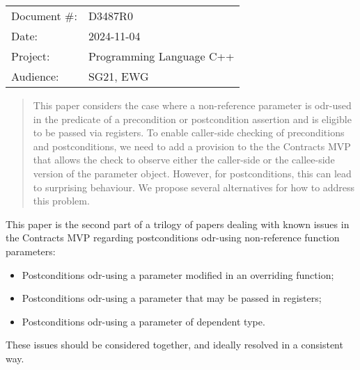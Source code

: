 \begin{tabular}{ll}
Document \#: & D3487R0 \\
Date: &2024-11-04 \\
Project: & Programming Language C++ \\
Audience: & SG21, EWG
\end{tabular}

\begin{abstract}
This paper considers the case where a non-reference parameter is odr-used in the predicate of a precondition or postcondition assertion and is eligible to be passed via registers. To enable caller-side checking of preconditions and postconditions, we need to add a provision to the the Contracts MVP \cite{P2900R10} that allows the check to observe either the caller-side or the callee-side version of the parameter object. However, for postconditions, this can lead to surprising behaviour. We propose several alternatives for how to address this problem.
\end{abstract}







This paper is the second part of a trilogy of papers dealing with known issues in the Contracts MVP \cite{P2900R10} regarding postconditions odr-using non-reference function parameters:
\begin{itemize}
\item \cite{D3484R1} Postconditions odr-using a parameter modified in an overriding function;
\item \cite{D3487R0} Postconditions odr-using a parameter that may be passed in registers;
\item \cite{D3489R0} Postconditions odr-using a parameter of dependent type.
\end{itemize}
These issues should be considered together, and ideally resolved in a consistent way.

